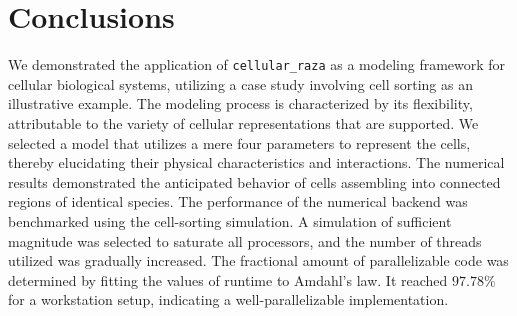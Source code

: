 \documentclass[fontsize=11pt,a4paper]{article}
\begin{document}
% 
% 

\section{Conclusions}\label{conclusions}

We demonstrated the application of \texttt{cellular\_raza} as a modeling framework for cellular
biological systems, utilizing a case study involving cell sorting as an illustrative example.
The modeling process is characterized by its flexibility, attributable to the variety of cellular
representations that are supported.
We selected a model that utilizes a mere four parameters to represent the cells, thereby elucidating
their physical characteristics and interactions.
The numerical results demonstrated the anticipated behavior of cells assembling into connected
regions of identical species.
The performance of the numerical backend was benchmarked using the cell-sorting simulation.
A simulation of sufficient magnitude was selected to saturate all processors, and the number of
threads utilized was gradually increased.
The fractional amount of parallelizable code was determined by fitting the values of runtime to
Amdahl's law.
It reached $97.78\%$ for a workstation setup, indicating a well-parallelizable implementation.
\end{document}
